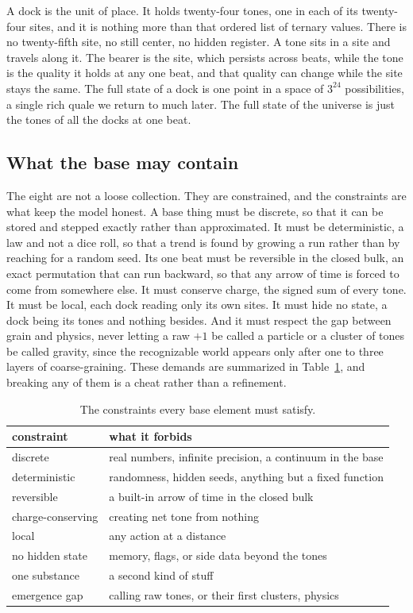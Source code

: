 A dock is the unit of place. It holds twenty-four tones, one in each of its twenty-four sites, and it is nothing more than that ordered list of ternary values. There is no twenty-fifth site, no still center, no hidden register. A tone sits in a site and travels along it. The bearer is the site, which persists across beats, while the tone is the quality it holds at any one beat, and that quality can change while the site stays the same. The full state of a dock is one point in a space of $3^{24}$ possibilities, a single rich quale we return to much later. The full state of the universe is just the tones of all the docks at one beat.

\subsection{What the base may contain}

The eight are not a loose collection. They are constrained, and the constraints are what keep the model honest. A base thing must be discrete, so that it can be stored and stepped exactly rather than approximated. It must be deterministic, a law and not a dice roll, so that a trend is found by growing a run rather than by reaching for a random seed. Its one beat must be reversible in the closed bulk, an exact permutation that can run backward, so that any arrow of time is forced to come from somewhere else. It must conserve charge, the signed sum of every tone. It must be local, each dock reading only its own sites. It must hide no state, a dock being its tones and nothing besides. And it must respect the gap between grain and physics, never letting a raw $+1$ be called a particle or a cluster of tones be called gravity, since the recognizable world appears only after one to three layers of coarse-graining. These demands are summarized in Table~\ref{tab:constraints}, and breaking any of them is a cheat rather than a refinement.

\begin{table}[ht]
\centering
\begin{tabular}{@{}lp{}@{}}
\toprule
constraint & what it forbids \\
\midrule
discrete & real numbers, infinite precision, a continuum in the base \\
deterministic & randomness, hidden seeds, anything but a fixed function \\
reversible & a built-in arrow of time in the closed bulk \\
charge-conserving & creating net tone from nothing \\
local & any action at a distance \\
no hidden state & memory, flags, or side data beyond the tones \\
one substance & a second kind of stuff \\
emergence gap & calling raw tones, or their first clusters, physics \\
\bottomrule
\end{tabular}
\caption{The constraints every base element must satisfy.}
\label{tab:constraints}
\end{table}

